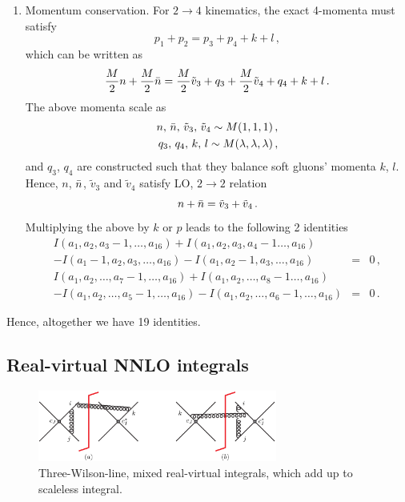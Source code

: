 \documentclass[a4paper,11pt]{article}
\numberwithin{equation}{section}
\begin{document}
\begin{enumerate}
  \item
  Momentum conservation. For $2 \to 4$ kinematics, the exact 4-momenta must satisfy
  \begin{equation}
    p_1 + p_2 = p_3 + p_4 + k + l\,,
  \end{equation}
  which can be written as
  \begin{equation}
   \frac{M}{2} n + \frac{M}{2} \bar{n}  = 
   \frac{M}{2} \tilde v_3 + q_3 + \frac{M}{2} \tilde v_4 + q_4 + k + l\,.
  \end{equation}
  The above momenta scale as
  \begin{eqnarray}
    n,\, \bar{n},\, \tilde v_3,\, \tilde v_4 \sim M (1,1,1)\,, \\
    q_3,\, q_4,\, k,\, l \sim M (\lambda, \lambda, \lambda)\,,
  \end{eqnarray}
  and $q_3$, $q_4$ are constructed such that they balance soft gluons' momenta
  $k$, $l$. Hence, $n$, $\bar{n}$, $\tilde v_3$ and $\tilde v_4$ satisfy LO, $2\to 2$ relation
  \begin{equation}
    n + \bar{n} = \tilde v_3 + \tilde v_4\,.
  \end{equation}
  Multiplying the above by $k$ or $p$ leads to the following 2 identities
  \begin{eqnarray}
    I(a_1,a_2, a_3-1,\ldots, a_{16}) 
    + I(a_1,a_2, a_3,a_4-1\ldots, a_{16}) & & \nonumber \\ 
    - I(a_1-1,a_2, a_3,\ldots, a_{16})  
    - I(a_1,a_2-1, a_3,\ldots, a_{16})   & = & 0\,,
    \\
    I(a_1,a_2, \ldots, a_7-1,\ldots, a_{16}) 
    + I(a_1,a_2, \ldots ,a_8-1\ldots, a_{16}) & &  \nonumber \\
    - I(a_1,a_2, \dots, a_5-1,\ldots, a_{16})   
    - I(a_1,a_2, \dots, a_6-1,\ldots, a_{16}) & = & 0\,.
  \end{eqnarray}
\end{enumerate}

Hence, altogether  we have  19 identities.

\subsection{Real-virtual NNLO integrals}

\begin{figure}[t]
  \begin{center}
    \includegraphics[width=0.7\textwidth]{plots/diagram4-pecjak.png}
  \end{center}
  \caption{
    Three-Wilson-line, mixed real-virtual integrals, which add up to scaleless
    integral.
  }
  \label{fig:pecjak4}
\end{figure}
%
\end{document}
